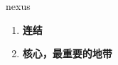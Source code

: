 
\begin{frame}
{\huge nexus}
\begin{center}
\begin{enumerate}\Large
  \item \textbf{连结}
  \item \textbf{核心，最重要的地带}
\end{enumerate}
\end{center}
\end{frame}
